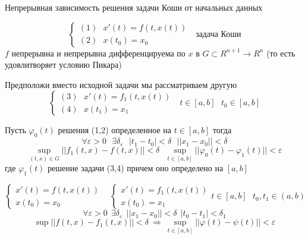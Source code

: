 \begin{title}[\Large]
  Непрерывная зависимость решения задачи Коши от начальных данных
\end{title}

\begin{define}
  $$
  \left\{
  \begin{array}{l}
    (1) ~~~ x'(t) = f(t, x(t)) \\
    (2) ~~~ x(t_0) = x_0
  \end{array}
  \right. ~~~ \text{задача Коши}
  $$
  $f$ непрерывна и непрерывна дифференцируема по $x$ в
  $G \subset R^{n+1} \to R^n$ (то есть удовлитворяет условию Пикара)

  Предположи вместо исходной задачи мы рассматриваем другую
  $$
  \left\{
  \begin{array}{l}
    (3) ~~~ x'(t) = f_1(t, x(t)) \\
    (4) ~~~ x(t_1) = x_1
  \end{array}
  \right. ~~~  t \in [a,b] ~~~ t_0 \in [a,b]
  $$
\end{define}

\begin{theorem}
  Пусть $\varphi_0(t)$ решения (1,2) определенное на $t \in [a,b]$ тогда
  $$
  \forall \varepsilon > 0
  ~~~
  \exists \delta_{\varepsilon}
  ~~~
  |t_1 - t_0| < \delta
  ~~~
  ||x_1 - x_0|| < \delta
  $$
  $$
  \sup_{(t, x) \in G} ||f_1(t,x) - f(t,x)|| < \delta
  ~~~
  \sup_{t \in [a,b]} ||\varphi_0(t) - \varphi_1(t)|| < \varepsilon
  $$
  где $\varphi_1(t)$ решение задачи (3,4) причем оно определено на $[a,b]$
\end{theorem}

\begin{define}
  $$
  \left\{
  \begin{array}{l}
    x'(t) = f(t, x(t)) \\
    x(t_0) = x_0
  \end{array}
  \right.
  ~~~~
  \left\{
  \begin{array}{l}
    x'(t) = f_1(t, x(t)) \\
    x(t_0) = x_1
  \end{array}
  \right.
  t \in [a,b] ~~~ t_0, t_1 \in (a,b)
  $$
  $$
  \forall \varepsilon > 0 ~~ \exists \delta_{\varepsilon} ~~ ||x_1 - x_0||
  < \delta ~~ |t_0 - t_1| < \delta_1
  $$
  $$
  \sup ||f(t,x) - f_1(t,x)|| < \delta
  ~ \Rightarrow ~ \sup_{t \in [a,b]} ||\varphi(t) - \psi(t)|| < \varepsilon
  $$
\end{define}

